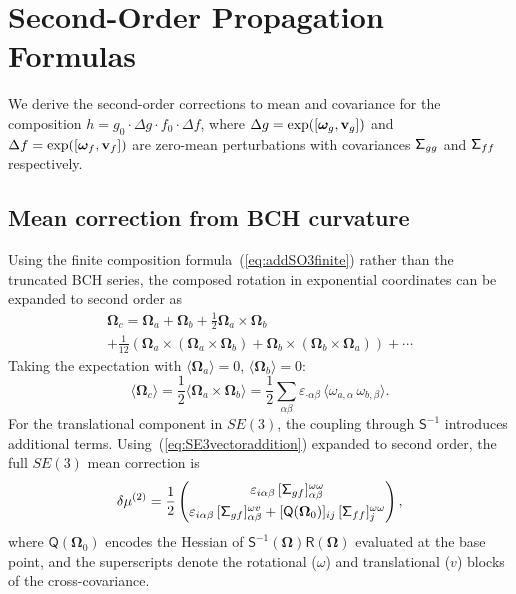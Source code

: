 \documentclass[journal]{IEEEtran}
\newcommand{\bfomega}{\boldsymbol{\omega}}
\newcommand{\bfOmega}{\boldsymbol{\Omega}}
\newcommand{\sfSigma}[1]{\mathsf{\Sigma}_\mathnormal{#1}}
\newcommand{\beq}{\begin{equation}}
\newcommand{\eeq}{\end{equation}}
\begin{document}
\section{Second-Order Propagation Formulas}
\label{app:secondorder}

We derive the second-order corrections to mean and covariance 
for the composition $h = g_0 \cdot \Delta g \cdot f_0 \cdot \Delta f$,
where $\Delta g = \exp([\bfomega_g, {\bf v}_g])$ and 
$\Delta f = \exp([\bfomega_f, {\bf v}_f])$ are zero-mean 
perturbations with covariances $\sfSigma{gg}$ and $\sfSigma{ff}$ respectively.

\subsection{Mean correction from BCH curvature}

Using the finite composition formula~(\ref{eq:addSO3finite}) rather than 
the truncated BCH series, the composed rotation in exponential coordinates 
can be expanded to second order as
\begin{multline}
    \bfOmega_c = \bfOmega_a + \bfOmega_b + \frac{1}{2}\bfOmega_a \times \bfOmega_b\\
    + \frac{1}{12}\left(\bfOmega_a \times (\bfOmega_a \times \bfOmega_b) 
    + \bfOmega_b \times (\bfOmega_b \times \bfOmega_a)\right) + \cdots
    \label{eq:BCHexpanded}
\end{multline}
Taking the expectation with $\langle \bfOmega_a \rangle = 0$, 
$\langle \bfOmega_b \rangle = 0$:
\beq
    \langle \bfOmega_c \rangle = \frac{1}{2}\langle \bfOmega_a \times \bfOmega_b \rangle
    = \frac{1}{2} \sum_{\alpha\beta} \varepsilon_{\cdot\alpha\beta}\, 
    \langle \omega_{a,\alpha}\, \omega_{b,\beta} \rangle.
    \label{eq:meanshift_rotation}
\eeq
For the translational component in $SE(3)$, the coupling through $\mathsf{S}^{-1}$ 
introduces additional terms. Using~(\ref{eq:SE3vectoraddition}) expanded to second order,
the full $SE(3)$ mean correction is
\beq
    \delta\mu^{(2)} = \frac{1}{2}
    \begin{pmatrix}
    \varepsilon_{i\alpha\beta}\, [\sfSigma{gf}]_{\alpha\beta}^{\omega\omega} \\[4pt]
    \varepsilon_{i\alpha\beta}\, [\sfSigma{gf}]_{\alpha\beta}^{\omega v}
    + [\mathsf{Q}(\bfOmega_0)]_{ij}\, [\sfSigma{ff}]_{j}^{\omega\omega}
    \end{pmatrix},
    \label{eq:fullmeancorrection}
\eeq
where $\mathsf{Q}(\bfOmega_0)$ encodes the Hessian of $\mathsf{S}^{-1}(\bfOmega)\mathsf{R}(\bfOmega)$
evaluated at the base point, and the superscripts denote the rotational ($\omega$) 
and translational ($v$) blocks of the cross-covariance.
\end{document}
